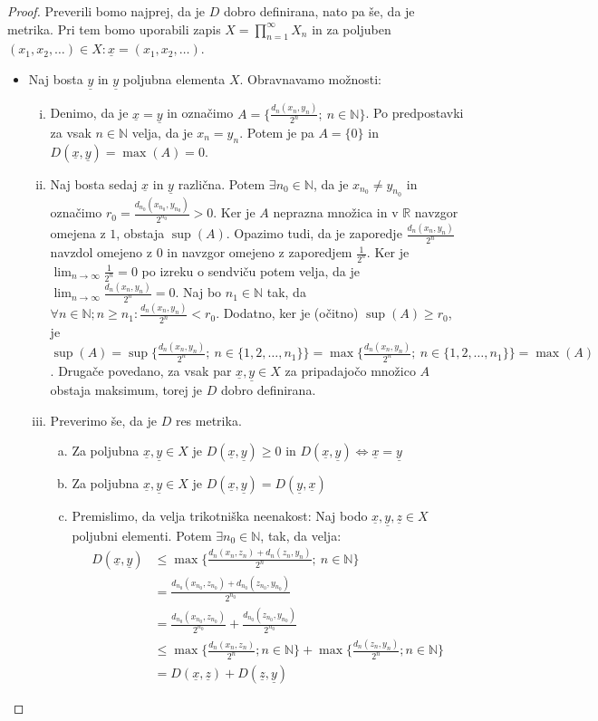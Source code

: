 \documentclass[a4paper, 10pt]{article}
\newcommand{\ul}[1]{\underline{\ensuremath{#1}}}
\newcommand{\mth}[1]{\ensuremath{\mathbb{#1}}}
\newcommand{\R}{\mth{R}}
\newcommand{\N}{\mth{N}}
\newcommand{\set}[1]{\ensuremath{\{1, 2, \ldots , #1\}}}
\begin{document}
	\begin{proof}
		Preverili bomo najprej, da je $D$ dobro definirana, nato pa še, da je metrika. Pri tem bomo uporabili zapis $X = \prod_{n = 1}^{\infty}X_n$ in za poljuben $(x_1, x_2, \ldots) \in X : \underline{x} = (x_1, x_2, \ldots)$.
		\begin{itemize}
			\item Naj bosta $\ul{y}$ in $\ul{y}$ poljubna elementa $X$. Obravnavamo možnosti: \begin{enumerate}[i)]
				\item Denimo, da je $\ul{x} = \ul{y}$ in označimo $A =\{\frac{d_n(x_n, y_n)}{2^n};~n\in\N\}$. Po predpostavki za vsak $n\in\N$ velja, da je $x_n = y_n$. Potem je pa $A = \{0\}$ in $D(\ul{x}, \ul{y})=\max(A) = 0$.
				\item Naj bosta sedaj $\ul{x}$ in $\ul{y}$ različna. Potem $\exists n_0\in \N$, da je $x_{n_0}\neq y_{n_0}$ in označimo $r_0 = \frac{d_{n_0}(x_{n_0}, y_{n_0})}{2^{n_0}} > 0$. Ker je $A$ neprazna množica in v $\R$ navzgor omejena z $1$, obstaja $\sup(A)$. Opazimo tudi, da je zaporedje $\frac{d_n(x_n, y_n)}{2^n}$ navzdol omejeno z $0$ in navzgor omejeno z zaporedjem $\frac{1}{2^n}$. Ker je $\lim_{n\to\infty}\frac{1}{2^n} = 0$ po izreku o sendviču potem velja, da je $\lim_{n\to\infty}\frac{d_n(x_n, y_n)}{2^n} = 0$. Naj bo $n_1\in \N$ tak, da $\forall n\in\N; n\geq n_1: \frac{d_n(x_n, y_n)}{2^n} < r_0$. Dodatno, ker je (očitno) $\sup(A) \geq r_0$, je $\sup(A) = \sup\{\frac{d_n(x_n, y_n)}{2^n};~n\in \set{n_1}\} = \max\{\frac{d_n(x_n, y_n)}{2^n};~n\in\set{n_1}\}=\max(A)$. Drugače povedano, za vsak par $\ul{x}, \ul{y}\in X$ za pripadajočo množico $A$ obstaja maksimum, torej je $D$ dobro definirana.
				\item Preverimo še, da je $D$ res metrika. \begin{enumerate}[a)]
					\item Za poljubna $\ul{x}, \ul{y}\in X$ je $D(\ul{x}, \ul{y}) \geq 0$ in $D(\ul{x}, \ul{y})\iff \ul{x} = \ul{y}$
					\item Za poljubna $\ul{x}, \ul{y}\in X$ je $D(\ul{x}, \ul{y}) = D(\ul{y}, \ul{x})$
					\item Premislimo, da velja trikotniška neenakost:
					Naj bodo $\ul{x}, \ul{y}, \ul{z}\in X$ poljubni elementi. Potem $\exists n_0 \in \N$, tak, da velja: \begin{align*}
						D(\ul{x}, \ul{y}) &\leq \max\{\frac{d_n(x_n, z_n) + d_n(z_n, y_n)}{2^n};~n\in\N\} \\ &=\frac{d_{n_0}(x_{n_0}, z_{n_0}) + d_{n_0}(z_{n_0}, y_{n_0})}{2^{n_0}} \\ 
						&= \frac{d_{n_0}(x_{n_0}, z_{n_0})}{2^{n_0}} + \frac{d_{n_0}(z_{n_0}, y_{n_0})}{2^{n_0}} \\
						&\leq \max\{\frac{d_n(x_n, z_n)}{2^n}; n\in\N\} + \max\{\frac{d_n(z_n, y_n)}{2^n}; n\in\N\} \\
						&= D(\ul{x}, \ul{z}) + D(\ul{z}, \ul{y})
					\end{align*} 
				\end{enumerate}
			\end{enumerate}
		\end{itemize}
	\end{proof}
\end{document}
